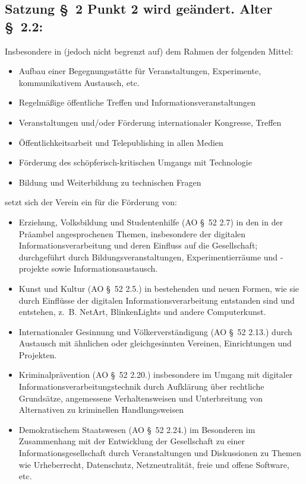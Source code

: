 \documentclass[10pt,a4paper]{scrartcl}
\begin{document}
\subsection*{Satzung \S\ 2 Punkt 2 wird ge{\"a}ndert. Alter \S\ 2.2:}
	Insbesondere in (jedoch nicht begrenzt auf) dem Rahmen der folgenden Mittel:
	\begin{itemize}
		\item Aufbau einer Begegnungsst{\"a}tte f{\"u}r Veranstaltungen, Experimente, kommunikativem Austausch, etc.
		\item Regelm{\"a}{\ss}ige {\"o}ffentliche Treffen und Informationsveranstaltungen
		\item Veranstaltungen und/oder F{\"o}rderung internationaler Kongresse, Treffen
		\item {\"O}ffentlichkeitsarbeit und Telepublishing in allen Medien
		\item F{\"o}rderung des sch{\"o}pferisch-kritischen Umgangs mit Technologie
		\item Bildung und Weiterbildung zu technischen Fragen
	\end{itemize}
	setzt sich der Verein ein f{\"u}r die F{\"o}rderung von:
	\begin{itemize}
		\item Erziehung, Volksbildung und Studentenhilfe (AO \S \ 52 2.7) in den in der Pr{\"a}ambel angesprochenen Themen,
			insbesondere der digitalen Informationsverarbeitung und deren Einfluss auf die Gesellschaft;
			durchgef{\"u}hrt durch Bildungsveranstaltungen, Experimentierr{\"a}ume und -projekte sowie Informationsaustausch.
		\item Kunst und Kultur (AO \S \ 52 2.5.) in bestehenden und neuen Formen, wie sie durch Einfl{\"u}sse der digitalen
			Informationsverarbeitung entstanden sind und entstehen, z.\, B. NetArt, BlinkenLights und andere Computerkunst.
		\item Internationaler Gesinnung und V{\"o}lkerverst{\"a}ndigung (AO \S \ 52 2.13.) durch Austausch mit {\"a}hnlichen oder gleichgesinnten
			Vereinen, Einrichtungen und Projekten.
		\item Kriminalpr{\"a}vention (AO \S \ 52 2.20.) insbesondere im Umgang mit digitaler Informationsverarbeitungstechnik durch
			Aufkl{\"a}rung {\"u}ber rechtliche Grunds{\"a}tze, angemessene Verhaltensweisen und Unterbreitung von Alternativen zu 
			kriminellen Handlungsweisen
		\item Demokratischem Staatswesen (AO \S \ 52 2.24.) im Besonderen im Zusammenhang mit der Entwicklung der Gesellschaft 
			zu einer Informationsgesellschaft durch Veranstaltungen und Diskussionen zu Themen wie Urheberrecht, Datenschutz, 
			Netzneutralit{\"a}t, freie und offene Software, etc.
	\end{itemize}
\end{document}
